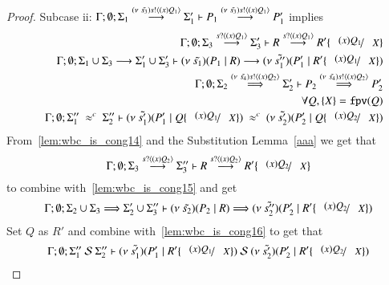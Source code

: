 \begin{proof}
	\noi Subcase ii: $\Gamma; \emptyset; \Sigma_1 \stackrel{(\nu\ \tilde{s_3}) s ! \langle (x)Q_1 \rangle}{\longrightarrow} \Sigma_1' \vdash P_1 \stackrel{(\nu\ \tilde{s_3}) s ! \langle (x)Q_1 \rangle}{\longrightarrow} P_1'$ implies
%
	\begin{eqnarray}
		& & \Gamma; \emptyset; \Sigma_3 \by{\bactinp{s}{\abs{x} {Q_1}}} \Sigma_3' \proves R \by{\bactinp{s}{\abs{x} {Q_1}}} R' \subst{\abs{x}{Q_1}}{X} \label{lem:wbc_is_cong14}\\
		& & \Gamma; \emptyset; \Sigma_1 \cup \Sigma_3 \by{} \Sigma_1' \cup \Sigma_3' \proves \newsp{\tilde{s_1}}{P_1 \Par R} \by{} \newsp{\tilde{s_1''}}{P_1' \Par R' \subst{\abs{x}{Q_1}}{X}}\\
		& & \Gamma; \emptyset; \Sigma_2\By{\news{\tilde{s_4}} \bactout{s}{\abs{x}{Q_2}}} \Sigma_2' \proves P_2 \By{\news{\tilde{s_4}} \bactout{s}{\abs{x}{Q_2}}} P_2' \label{lem:wbc_is_cong15}\\
		& & \forall Q, \set{X} = \fpv{Q} \\
		& & \Gamma; \emptyset; \Sigma_1''\ \wbc\ \Sigma_2'' \proves \newsp{\tilde{s_1'}}{P_1' \Par Q \subst{(x) Q_1}{X}}\ \wbc\ \newsp{\tilde{s_2'}}{P_2' \Par Q \subst{(x) Q_2}{X}} \label{lem:wbc_is_cong16}
	\end{eqnarray}
%
	From~\ref{lem:wbc_is_cong14} and the Substitution Lemma~\ref{aaa} we get that
	\[
		\Gamma; \emptyset; \Sigma_3 \by{\bactinp{s}{\abs{x} {Q_2}}} \Sigma_3'' \proves R \by{\bactinp{s}{\abs{x} {Q_2}}} R' \subst{\abs{x}{Q_2}}{X}
	\]
	\noi to combine with~\ref{lem:wbc_is_cong15} and get
	\[
		\Gamma; \emptyset; \Sigma_2 \cup \Sigma_3 \By{} \Sigma_2' \cup \Sigma_3'' \proves \newsp{\tilde{s_2}}{P_2 \Par R} \By{} \newsp{\tilde{s_2''}}{P_2' \Par R' \subst{\abs{x}{Q_2}}{X}}
	\]
%
	\noi Set $Q$ as $R'$ and combine with~\ref{lem:wbc_is_cong16} to get that
%
	\[
		\Gamma; \emptyset; \Sigma_1''\ \mathcal{S}\ \Sigma_2'' \proves \newsp{\tilde{s_1'}}{P_1' \Par R' \subst{\abs{x}{Q_1}}{X}}\ \mathcal{S}\ \newsp{\tilde{s_2'}}{P_2' \Par R' \subst{\abs{x}{Q_2}}{X}}
	\]


\end{proof}
